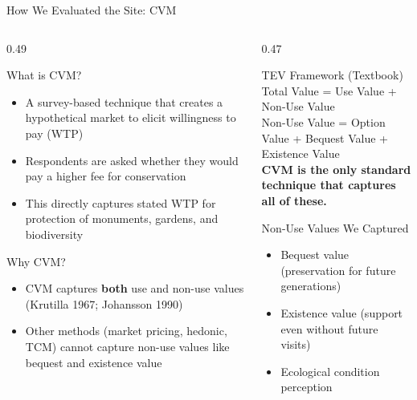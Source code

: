 \documentclass[10pt, aspectratio=169]{beamer}
\begin{document}
\begin{frame}{How We Evaluated the Site: CVM}
    \begin{columns}[T]
        \begin{column}{0.49\textwidth}
            \begin{block}{What is CVM?}
                \small
                \begin{itemize}
                    \item A survey-based technique that creates a hypothetical market to elicit willingness to pay (WTP)
                    \item Respondents are asked whether they would pay a higher fee for conservation
                    \item This directly captures stated WTP for protection of monuments, gardens, and biodiversity
                \end{itemize}
            \end{block}

            \vspace{0.3em}
            \begin{block}{Why CVM?}
                \small
                \begin{itemize}
                    \item CVM captures \textbf{both} use and non-use values (Krutilla 1967; Johansson 1990)
                    \item Other methods (market pricing, hedonic, TCM) cannot capture non-use values like bequest and existence value
                \end{itemize}
            \end{block}
        \end{column}
        \begin{column}{0.47\textwidth}
            \begin{block}{TEV Framework (Textbook)}
                \small
                Total Value = Use Value + Non-Use Value\\[4pt]
                Non-Use Value = Option Value + Bequest Value + Existence Value\\[6pt]
                \textbf{CVM is the only standard technique that captures all of these.}
            \end{block}

            \vspace{0.3em}
            \begin{block}{Non-Use Values We Captured}
                \small
                \begin{itemize}
                    \item Bequest value (preservation for future generations)
                    \item Existence value (support even without future visits)
                    \item Ecological condition perception
                \end{itemize}
            \end{block}
        \end{column}
    \end{columns}
\end{frame}
\end{document}
